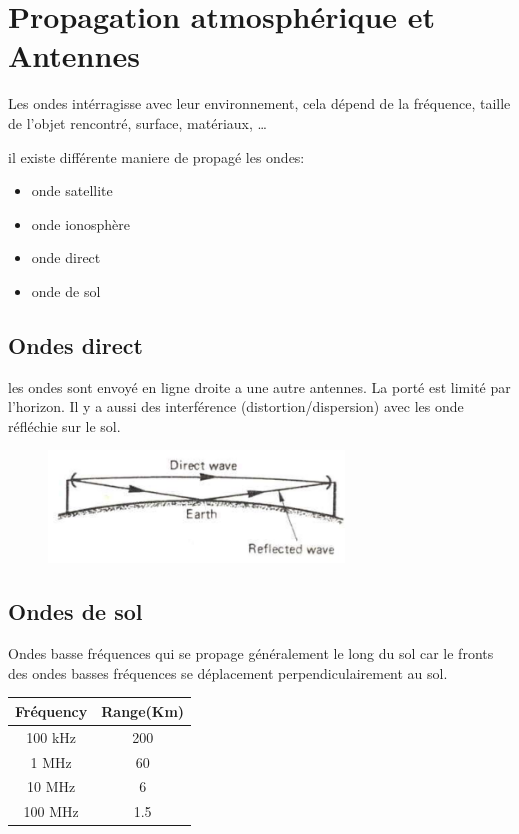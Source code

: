 \section{Propagation atmosphérique et Antennes}
	Les ondes intérragisse avec leur environnement, cela dépend de la fréquence, taille de l'objet rencontré, surface, matériaux, \dots
	
	il existe différente maniere de propagé les ondes:
	\begin{itemize}
		\item onde satellite
		\item onde ionosphère
		\item onde direct
		\item onde de sol
	\end{itemize}
	
	
	\subsection{Ondes direct}
		les ondes sont envoyé en ligne droite a une autre antennes. La porté est limité par l'horizon. Il y a aussi des interférence (distortion/dispersion) avec les onde réfléchie sur le sol.
		
		\begin{figure}[H]
			\centering
			\includegraphics[width=0.7\textwidth]{img/onde_direct.png}
		\end{figure}
	
	\subsection{Ondes de sol}
		Ondes basse fréquences qui se propage généralement le long du sol car le fronts des ondes basses fréquences se déplacement perpendiculairement au sol.
		\begin{center}
			\begin{tabular}{c|c}
			\hline
			Fréquency & Range(Km)\\
			\hline
			100 kHz & 200\\
			1 MHz & 60\\
			10 MHz & 6\\
			100 MHz & 1.5\\
			\hline
		
		\end{tabular}
		\end{center}
		
